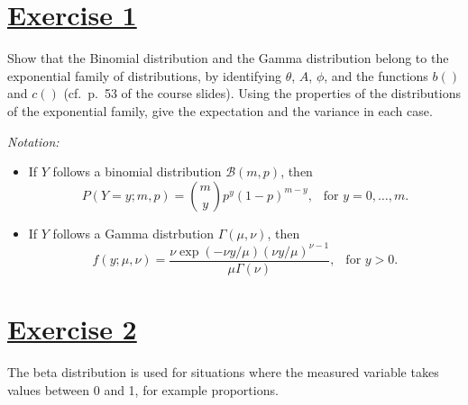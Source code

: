 \documentclass[a4paper,12pt]{article}
\begin{document}
%


\begin{center}
\bigskip

\bigskip

\bigskip

\bigskip

\bigskip

\bigskip


\bigskip

\bigskip

\bigskip
\end{center}


\setlength{\parskip}{1ex plus 0.5ex minus 0.2ex}
\parindent=0cm
\setlength{\parskip}{1ex plus 0.5ex minus 0.2ex}
\linespread{1.1}
\sloppy

\section{\underline{Exercise 1}}

Show that the Binomial distribution and the Gamma distribution belong to the exponential family of distributions, by identifying $\theta$, $A$, $\phi$, and the functions $b()$ and $c()$ (cf.\ p.~53 of the course slides). Using the properties of the distributions of the exponential family, give the expectation and the variance in each case.

\textit{Notation:}
\begin{itemize}
\item If $Y$ follows a  binomial distribution ${\mathcal B}(m,p)$, then 
$$P(Y=y; m,p) = {m \choose y} p^{y} (1- p)^{m-y}, \ \  \mbox{ for } y=0, \ldots, m.$$
\item If $Y$ follows a Gamma distrbution $\Gamma(\mu,\nu)$, then 
$$f(y;\mu,\nu)=\frac{\nu \exp(-\nu y/\mu)(\nu y/\mu)^{\nu-1}}{\mu\Gamma(\nu)}, \ \  \mbox{ for } y>0.$$
\end{itemize}


\section{\underline{Exercise 2}}
The beta distribution is used for situations where the measured variable takes values between 0 and 1, for example proportions.
\end{document}
